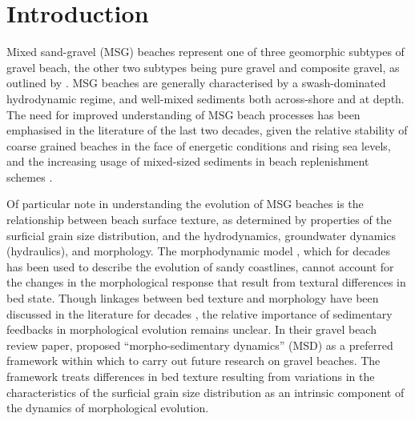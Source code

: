 %





\section{Introduction}

Mixed sand-gravel (MSG) beaches represent one of three geomorphic subtypes of gravel beach, the other two subtypes being pure gravel and composite gravel, as outlined by \cite{Jennings_Shulmeister2002}. MSG beaches are generally characterised by a swash-dominated hydrodynamic regime, and well-mixed sediments both across-shore and at depth. The need for improved understanding of MSG beach processes has been emphasised in the literature of the last two decades, given the relative stability of coarse grained beaches in the face of energetic conditions and rising sea levels, and the increasing usage of mixed-sized sediments in beach replenishment schemes \citep{Mason_Coates2001}. 


Of particular note in understanding the evolution of MSG beaches is the relationship between beach surface texture, as determined by properties of the surficial grain size distribution, and the hydrodynamics, groundwater dynamics (hydraulics), and morphology. The morphodynamic model \citep{Wright_Thom1977, Buscombe_Masselink2006}, which for decades has been used to describe the evolution of sandy coastlines, cannot account for the changes in the morphological response that result from textural differences in bed state. Though linkages between bed texture and morphology have been discussed in the literature for decades \citep[e.g.,][]{LonguetHiggins_Parkin1962, Moss1962, Isla1993, Carter_Orford1993, Sherman_etal1993, Masselink_Li2001, Buscombe_Masselink2006, Masselink_etal2007, Austin_Buscombe2008, VanGaalen_etal2011, Guest_Hay2019}, the relative importance of sedimentary feedbacks in morphological evolution remains unclear. In their gravel beach review paper, \citet{Buscombe_Masselink2006} proposed ``morpho-sedimentary dynamics'' (MSD) as a preferred framework within which to carry out future research on gravel beaches. The framework treats differences in bed texture resulting from variations in the characteristics of the surficial grain size distribution as an intrinsic component of the dynamics of morphological evolution. 

